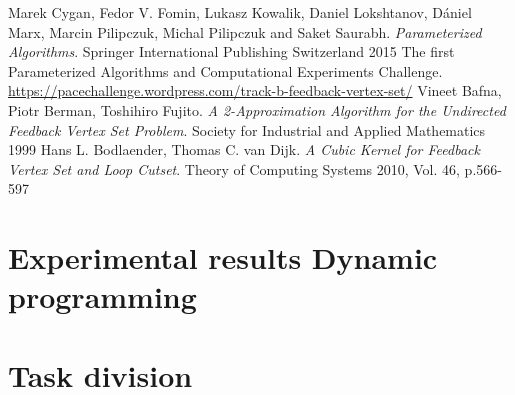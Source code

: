 \documentclass[a4paper,10pt]{article}
\begin{document}

\begin{thebibliography}{9}
 Marek Cygan, Fedor V. Fomin, Lukasz Kowalik, Daniel Lokshtanov, Dániel Marx, Marcin Pilipczuk, Michal Pilipczuk and Saket Saurabh. \textit{Parameterized Algorithms}. Springer International Publishing Switzerland 2015
 The first Parameterized Algorithms and Computational Experiments Challenge. \url{https://pacechallenge.wordpress.com/track-b-feedback-vertex-set/}
 Vineet Bafna, Piotr Berman, Toshihiro Fujito. \textit{A 2-Approximation Algorithm for the Undirected Feedback Vertex Set Problem}. Society for Industrial and Applied Mathematics 1999
 Hans L. Bodlaender, Thomas C. van Dijk. \textit{A Cubic Kernel for Feedback Vertex Set and Loop Cutset}. Theory of Computing Systems 2010, Vol. 46, p.566-597
\end{thebibliography}

\clearpage
\appendix

%

\FloatBarrier
\section{Experimental results Dynamic programming} \label{app:dynamicprogram}


\FloatBarrier
\section{Task division}

\end{document}
